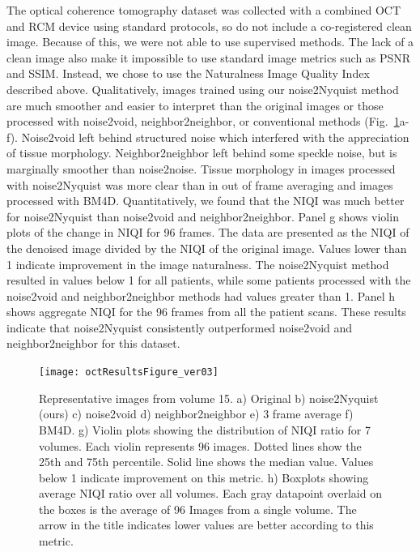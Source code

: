 \documentclass[12pt]{spieman}
\begin{document}
\begin{spacing}{2}
The optical coherence tomography dataset was collected with a combined OCT and RCM device\cite{Iftimia2017a} using standard protocols, so do not include a co-registered clean image. Because of this, we were not able to use supervised methods. The lack of a clean image also make it impossible to use standard image metrics such as PSNR and SSIM. Instead, we chose to use the Naturalness Image Quality Index described above. Qualitatively, images trained using our noise2Nyquist method are much smoother and easier to interpret than the original images or those processed with noise2void, neighbor2neighbor, or conventional methods (Fig.~\ref{fig:octResults}a-f). Noise2void left behind structured noise which interfered with the appreciation of tissue morphology. Neighbor2neighbor left behind some speckle noise, but is marginally smoother than noise2noise. Tissue morphology in images processed with noise2Nyquist was more clear than in out of frame averaging and images processed with BM4D. Quantitatively, we found that the NIQI was much better for noise2Nyquist than noise2void and neighbor2neighbor. Panel g shows violin plots of the change in NIQI for 96 frames. The data are presented as the NIQI of the denoised image divided by the NIQI of the original image. Values lower than 1 indicate improvement in the image naturalness. The noise2Nyquist method resulted in values below 1 for all patients, while some patients processed with the noise2void and neighbor2neighbor methods had values greater than 1. Panel h shows aggregate NIQI for the 96 frames from all the patient scans. These results indicate that noise2Nyquist consistently outperformed noise2void and neighbor2neighbor for this dataset.

\begin{figure}[htb]
	\begin{center}
		\texttt{[image: octResultsFigure\_ver03]}
		\caption{\label{fig:octResults}Representative images from volume 15. a) Original b) noise2Nyquist (ours) c) noise2void d) neighbor2neighbor e) 3 frame average f) BM4D. g) Violin plots showing the distribution of NIQI ratio for 7 volumes. Each violin represents 96 images. Dotted lines show the 25th and 75th percentile. Solid line shows the median value. Values below 1 indicate improvement on this metric. h) Boxplots showing average NIQI ratio over all volumes. Each gray datapoint overlaid on the boxes is the average of 96 Images from a single volume. The arrow in the title indicates lower values are better according to this metric.}
	\end{center}
\end{figure}


\end{spacing}
\end{document}
